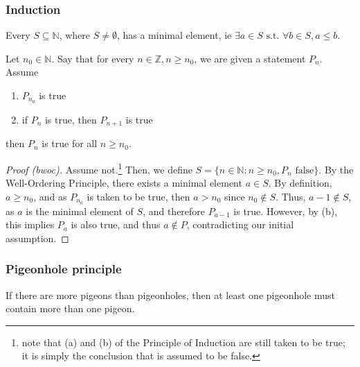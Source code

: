 \documentclass[12pt,oneside]{article}
\begin{document}
\subsubsection{Induction}

\begin{axiom}
  Every $S \subseteq \mathbb{N}$, where $S \neq \emptyset$, has a minimal element, ie $\exists a \in S \text{ s.t. } \forall b \in S, a \leq b$.
\end{axiom}

\begin{theorem}
  Let $n_0 \in \mathbb{N}$. Say that for every $n \in \mathbb{Z}, n \geq n_0$, we are given a statement $P_n$. Assume
  \begin{enumerate}[label=(\alph*)]
    \item $P_{n_0}$ is true
    \item if $P_n$ is true, then $P_{n+1}$ is true
  \end{enumerate}
  then $P_n$ is true for all $n \geq n_0$.
\end{theorem}

\begin{proof}[Proof (bwoc)]
 Assume not.\footnote{note that (a) and (b) of the Principle of Induction are still taken to be true; it is simply the conclusion that is assumed to be false. } Then, we define $S = \{n \in \mathbb{N} : n \geq n_0, P_n \text{ false}\}$. By the Well-Ordering Principle, there exists a minimal element $a \in S$. By definition, $a \geq n_0$, and as $P_{n_0}$ is taken to be true, then $a > n_0$ since $n_0 \notin S$. Thus, $a-1 \notin S$, as $a$ is the minimal element of $S$, and therefore $P_{a-1}$ is true. However, by (b), this implies $P_{a}$ is also true, and thus $a \notin P$, contradicting our initial assumption.
\end{proof}

\subsubsection{Pigeonhole principle}
\begin{axiom}
  If there are more pigeons than pigeonholes, then at least one pigeonhole must contain more than one pigeon.\footnotemark
\end{axiom}
\end{document}
